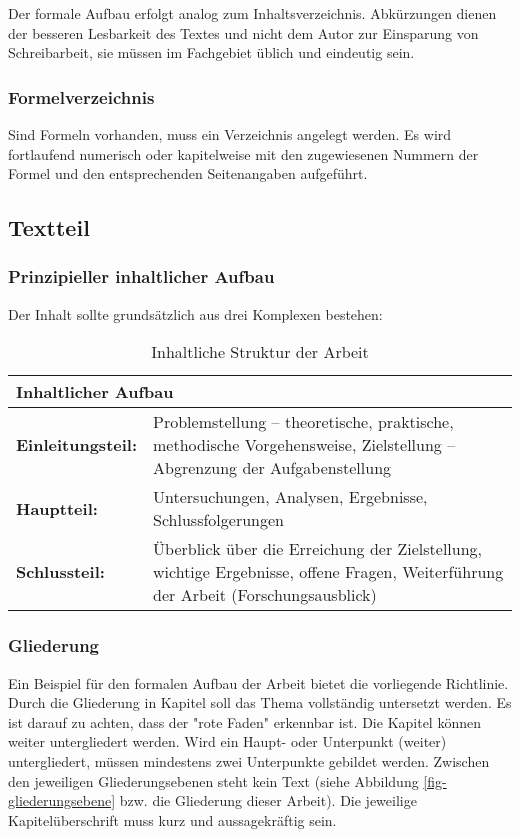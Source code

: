 Der formale Aufbau erfolgt analog zum Inhaltsverzeichnis.
Abkürzungen dienen der besseren Lesbarkeit des Textes und nicht dem Autor zur Einsparung von Schreibarbeit, sie müssen im Fachgebiet üblich und eindeutig sein.

\subsubsection{Formelverzeichnis}
\label{formal-gestaltung-aufbau-formel-verz}
Sind Formeln vorhanden, muss ein Verzeichnis angelegt werden.
Es wird fortlaufend numerisch oder kapitelweise mit den zugewiesenen Nummern der Formel und den entsprechenden Seitenangaben aufgeführt.

\subsection{Textteil}
\label{formal-gestaltung-textteil}
\subsubsection{Prinzipieller inhaltlicher Aufbau}
\label{formal-gestaltung-textteil-prinzipiell}
Der Inhalt sollte grundsätzlich aus drei Komplexen bestehen:
\begin{table}
    \begin{tabularx}{\columnwidth}{|l|X|}
        \hline
        \multicolumn{2}{|l|}{\textbf{Inhaltlicher Aufbau}} \\
        \hline
        \textbf{Einleitungsteil:} & Problemstellung – theoretische, praktische, methodische Vorgehensweise, Zielstellung – Abgrenzung der Aufgabenstellung \\
        \hline
        \textbf{Hauptteil:} & Untersuchungen, Analysen, Ergebnisse, Schlussfolgerungen \\
        \hline
        \textbf{Schlussteil:} & Überblick über die Erreichung der Zielstellung, wichtige Ergebnisse, offene Fragen, Weiterführung der Arbeit (Forschungsausblick) \\
        \hline        
    \end{tabularx}
    \caption{Inhaltliche Struktur der Arbeit}
    \label{tab-inhaltl-strukt-arbeit}
\end{table}
\subsubsection{Gliederung}
\label{formal-gestaltung-textteil-gliederung}
Ein Beispiel für den formalen Aufbau der Arbeit bietet die vorliegende Richtlinie.
Durch die Gliederung in Kapitel soll das Thema vollständig untersetzt werden.
Es ist darauf zu achten, dass der "rote Faden" erkennbar ist.
Die Kapitel können weiter untergliedert werden.
Wird ein Haupt- oder Unterpunkt (weiter) untergliedert, müssen mindestens zwei Unterpunkte gebildet werden.
Zwischen den jeweiligen Gliederungsebenen steht kein Text (siehe Abbildung \ref{fig-gliederungsebene} bzw. die Gliederung dieser Arbeit).
Die jeweilige Kapitelüberschrift muss kurz und aussagekräftig sein.

